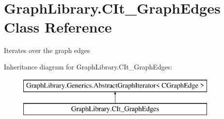 \hypertarget{class_graph_library_1_1_c_it___graph_edges}{}\section{Graph\+Library.\+C\+It\+\_\+\+Graph\+Edges Class Reference}
\label{class_graph_library_1_1_c_it___graph_edges}


Iterates over the graph edges  


Inheritance diagram for Graph\+Library.\+C\+It\+\_\+\+Graph\+Edges\+:\begin{figure}[H]
\begin{center}
\leavevmode
\includegraphics[height=2.000000cm]{class_graph_library_1_1_c_it___graph_edges}
\end{center}
\end{figure}
